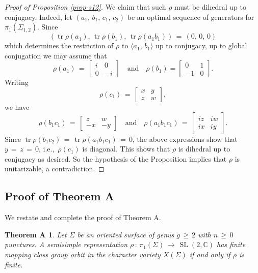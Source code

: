 \documentclass[reqno]{amsart}
\theoremstyle{plain}
\newtheorem*{theorema}{Theorem A}
\theoremstyle{definition}
\theoremstyle{remark}
\DeclareMathOperator{\SL}{SL}
\DeclareMathOperator{\tr}{tr}
\newcommand{\slc}{{\SL (2,\mathbb{C})}}
\begin{document}
\begin{proof}[Proof of Proposition \ref{prop-s12}]
We claim that such $\rho$ must be dihedral up to conjugacy. Indeed, let $(a_1,\,b_1,\,c_1,\,c_2)$ be an optimal 
sequence of generators for $\pi_1(\Sigma_{1,2})$. Since
$$(\tr\rho(a_1),\,\tr\rho(b_1),\,\tr\rho(a_1b_1))\,=\,(0,\,0,\,0)$$
which determines the restriction of $\rho$ to $\langle a_1,\,b_1\rangle$ up to conjugacy, up to global
conjugation we may assume that
$$\rho(a_1)\,=\,\begin{bmatrix}i & 0 \\ 0 & -i\end{bmatrix}\quad\text{and}\quad\rho(b_1)=\begin{bmatrix}0 & 1\\ -1 & 0\end{bmatrix}.$$
Writing
$$\rho(c_1)\,=\,\begin{bmatrix}x & y\\ z & w\end{bmatrix},$$
we have
$$\rho(b_1c_1)\,=\,\begin{bmatrix}
z & w\\ -x & -y
\end{bmatrix}\quad\text{and}\quad
\rho(a_1b_1c_1)\,=\,\begin{bmatrix}
iz & iw\\ ix & iy
\end{bmatrix}.
$$
Since $\tr\rho(b_1c_2)\,=\,\tr\rho(a_1b_1c_1)\,=\,0$, the above expressions show that $y
\,=\,z\,=\,0$, i.e.,~$\rho(c_1)$ is diagonal. This shows that $\rho$ is dihedral up to conjugacy as desired. So
the hypothesis of the Proposition implies that $\rho$ is unitarizable, a contradiction.
\end{proof}

\subsection{Proof of Theorem A}\label{sec:5.3}
We restate and complete the proof of Theorem A.

\begin{theorema}
Let $\Sigma$ be an oriented surface of genus $g\,\geq\,2$ with $n\,\geq\,0$ punctures. A semisimple
representation $\rho\,:\,\pi_1(\Sigma)\,\to\,\slc$ has finite mapping class group orbit in the character
variety $X(\Sigma)$ if and only if $\rho$ is finite.
\end{theorema}
\end{document}
